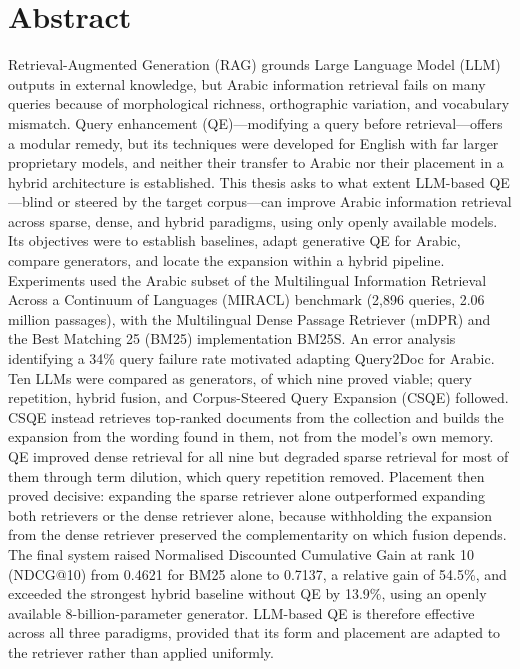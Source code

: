 \chapter*{Abstract}

Retrieval-Augmented Generation (RAG) grounds Large Language Model (LLM) outputs in external knowledge, but Arabic information retrieval fails on many queries because of morphological richness, orthographic variation, and vocabulary mismatch. Query enhancement (QE)---modifying a query before retrieval---offers a modular remedy, but its techniques were developed for English with far larger proprietary models, and neither their transfer to Arabic nor their placement in a hybrid architecture is established. This thesis asks to what extent LLM-based QE---blind or steered by the target corpus---can improve Arabic information retrieval across sparse, dense, and hybrid paradigms, using only openly available models. Its objectives were to establish baselines, adapt generative QE for Arabic, compare generators, and locate the expansion within a hybrid pipeline. Experiments used the Arabic subset of the Multilingual Information Retrieval Across a Continuum of Languages (MIRACL) benchmark (2,896 queries, 2.06 million passages), with the Multilingual Dense Passage Retriever (mDPR) and the Best Matching 25 (BM25) implementation BM25S. An error analysis identifying a 34\% query failure rate motivated adapting Query2Doc for Arabic. Ten LLMs were compared as generators, of which nine proved viable; query repetition, hybrid fusion, and Corpus-Steered Query Expansion (CSQE) followed. CSQE instead retrieves top-ranked documents from the collection and builds the expansion from the wording found in them, not from the model's own memory. QE improved dense retrieval for all nine but degraded sparse retrieval for most of them through term dilution, which query repetition removed. Placement then proved decisive: expanding the sparse retriever alone outperformed expanding both retrievers or the dense retriever alone, because withholding the expansion from the dense retriever preserved the complementarity on which fusion depends. The final system raised Normalised Discounted Cumulative Gain at rank 10 (NDCG@10) from 0.4621 for BM25 alone to 0.7137, a relative gain of 54.5\%, and exceeded the strongest hybrid baseline without QE by 13.9\%, using an openly available 8-billion-parameter generator. LLM-based QE is therefore effective across all three paradigms, provided that its form and placement are adapted to the retriever rather than applied uniformly.
